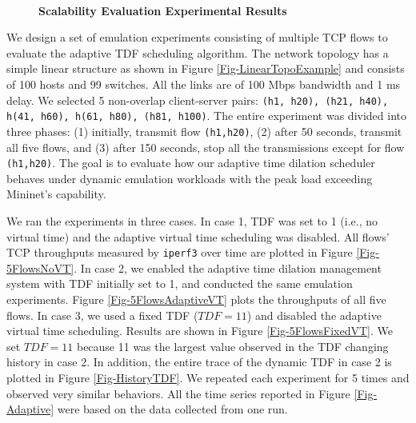 \begin{figure*}
\centering
	~
\caption{\textbf{Scalability Evaluation Experimental Results}}
\end{figure*}

We design a set of emulation experiments consisting of multiple TCP flows to evaluate the adaptive TDF scheduling algorithm. The network topology has a simple linear structure as shown in Figure \ref{Fig-LinearTopoExample} and consists of 100 hosts and 99 switches. All the links are of 100 Mbps bandwidth and 1 ms delay. We selected 5 non-overlap client-server pairs: \texttt{(h1, h20), (h21, h40), h(41, h60), h(61, h80), (h81, h100)}. The entire experiment was divided into three phases: (1) initially, transmit flow \texttt{(h1,h20)}, (2) after 50 seconds, transmit all five flows, and (3) after 150 seconds, stop all the transmissions except for flow \texttt{(h1,h20)}. The goal is to evaluate how our adaptive time dilation scheduler behaves under dynamic emulation workloads with the peak load exceeding Mininet's capability.
 
We ran the experiments in three cases. In case 1, TDF was set to 1 (i.e., no virtual time) and the adaptive virtual time scheduling was disabled. All flows' TCP throughputs measured by \texttt{iperf3} over time are plotted in Figure \ref{Fig-5FlowsNoVT}. 
In case 2, we enabled the adaptive time dilation management system with TDF initially set to 1, and conducted the same emulation experiments. Figure \ref{Fig-5FlowsAdaptiveVT} plots the throughputs of all five flows. In case 3, we used a fixed TDF ($TDF = 11$) and disabled the adaptive virtual time scheduling. Results are shown in Figure \ref{Fig-5FlowsFixedVT}. We set $TDF=11$ because 11 was the largest value observed in the TDF changing history in case 2. In addition, the entire trace of the dynamic TDF in case 2 is plotted in Figure \ref{Fig-HistoryTDF}. We repeated each experiment for 5 times and observed very similar behaviors. All the time series reported in Figure \ref{Fig-Adaptive} were based on the data collected from one run. 

